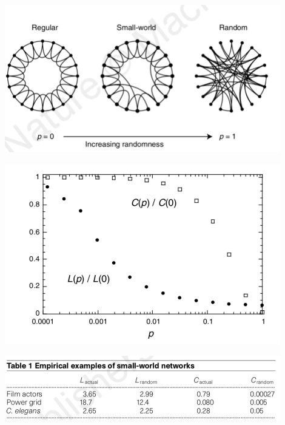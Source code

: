 \documentclass[aspectratio=169]{beamer}
\begin{document}
\begin{frame}

\begin{center}
\includegraphics[width = 0.9\textwidth]{figures/watts_collective_1998_fig1}
\end{center}

\end{frame}
\begin{frame}

\begin{center}
\includegraphics[width = 0.9\textwidth]{figures/watts_collective_1998_fig2}
\end{center}

\end{frame}
\begin{frame}

\begin{center}
\includegraphics[width = 0.9\textwidth]{figures/watts_collective_1998_tab1}
\end{center}

\end{frame}
\end{document}
